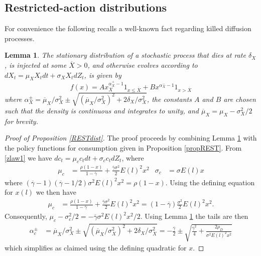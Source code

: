 \documentclass[11pt]{article}
\theoremstyle{plain}
\newtheorem{lemma}[thm]{Lemma}
\begin{document}
\subsection{Restricted-action distributions} \label{restDISTsect}
For convenience the following recalls a well-known fact regarding killed diffusion processes.
\begin{lemma} \label{genLEMMA}
The stationary distribution of a stochastic process that dies at rate $\delta_X$, is injected at some $\overline{X} > 0$, and otherwise evolves according to $dX_t = \mu_XX_tdt + \sigma_XX_t dZ_t$, is given by 
$$
f(x) = A x^{\alpha^+_X-1}_X1_{x \leq \overline{X}} + B x^{\alpha^-_X-1}1_{x > \overline{X}}
$$
where $\alpha^{\pm}_X =  \overline{\mu}_X/\sigma_X^2 \pm  \sqrt{(\overline{\mu}_X/\sigma_X^2)^2+2\delta_X/\sigma_X^2}$, the constants $A$ and $B$ are chosen such that the density is continuous and integrates to unity, and $\overline{\mu}_X = \mu_X - \sigma_X^2/2$ for brevity.
\end{lemma}
\begin{proof}[Proof of Proposition \ref{RESTdist}] The proof proceeds by combining Lemma \ref{genLEMMA} with the policy functions for consumption given in Proposition \ref{propREST}. From \eqref{zlaw1} we have $dc_t = \mu_cc_tdt + \sigma_cc_t dZ_t$, where
\begin{align*}
\mu_c & = \frac{\rho(1 - x)}{1-\overline{\gamma}} + \frac{\overline{\gamma}\sigma^2}{2}E(l)^2x^2  &
\sigma_c & = \sigma E(l)x
\end{align*}
where $(\overline{\gamma} - 1) (\overline{\gamma} - 1/2) \sigma^2 E(l)^2 x^2 = \rho(1 - x)$. Using the defining equation for $x(l)$ we then have 
\begin{align*}
\mu_c & = \frac{\rho(1 - x)}{1-\overline{\gamma}} + \frac{\overline{\gamma}\sigma^2}{2}E(l)^2x^2 = (1 - \overline{\gamma})\frac{\sigma^2}{2}E(l)^2x^2.
\end{align*}
Consequently, $\mu_c - \sigma_c^2/2 = -\overline{\gamma} \sigma^2 E(l)^2x^2/2$. Using Lemma \ref{genLEMMA} the tails are then
\begin{align*}
\alpha^{\pm}_c &  =  \overline{\mu}_X/\sigma_X^2 \pm  \sqrt{{\left(\overline{\mu}_X/\sigma_X^2\right)}^2 + 2\delta_X/\sigma_X^2}   =  -\frac{\overline{\gamma}}{2}  \pm  \sqrt{ \frac{\overline{\gamma}^2}{4} + \frac{2\rho_D}{\sigma^2E(l)^2x^2}} 
\end{align*}
which simplifies as claimed using the defining quadratic for $x$. 
\end{proof}
\end{document}

